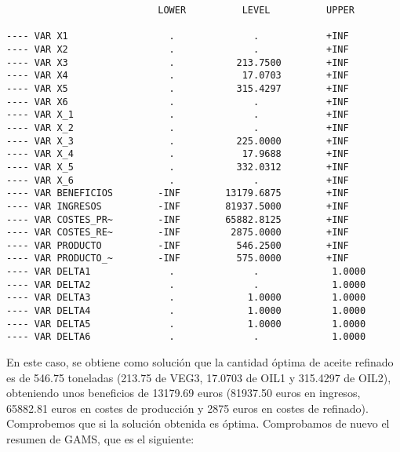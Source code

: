 \documentclass[12pt,a4paper,twoside,openright,titlepage,final]{article}
\begin{document}
\begin{verbatim}
                           LOWER          LEVEL          UPPER        

---- VAR X1                  .              .            +INF              
---- VAR X2                  .              .            +INF               
---- VAR X3                  .           213.7500        +INF                   
---- VAR X4                  .            17.0703        +INF                 
---- VAR X5                  .           315.4297        +INF                
---- VAR X6                  .              .            +INF                  
---- VAR X_1                 .              .            +INF                
---- VAR X_2                 .              .            +INF                 
---- VAR X_3                 .           225.0000        +INF                  
---- VAR X_4                 .            17.9688        +INF              
---- VAR X_5                 .           332.0312        +INF               
---- VAR X_6                 .              .            +INF         
---- VAR BENEFICIOS        -INF        13179.6875        +INF               
---- VAR INGRESOS          -INF        81937.5000        +INF                  
---- VAR COSTES_PR~        -INF        65882.8125        +INF                    
---- VAR COSTES_RE~        -INF         2875.0000        +INF                  
---- VAR PRODUCTO          -INF          546.2500        +INF                 
---- VAR PRODUCTO_~        -INF          575.0000        +INF               
---- VAR DELTA1              .              .             1.0000      
---- VAR DELTA2              .              .             1.0000    
---- VAR DELTA3              .             1.0000         1.0000    
---- VAR DELTA4              .             1.0000         1.0000              
---- VAR DELTA5              .             1.0000         1.0000           
---- VAR DELTA6              .              .             1.0000           
\end{verbatim}

En este caso, se obtiene como solución que la cantidad óptima de aceite refinado es de 546.75 toneladas (213.75 de VEG3, 17.0703 de OIL1 y 315.4297 de OIL2), obteniendo unos beneficios de 13179.69 euros (81937.50 euros en ingresos, 65882.81 euros en costes de producción y 2875 euros en costes de refinado).\\

Comprobemos que si la solución obtenida es óptima. Comprobamos de nuevo el resumen de GAMS, que es el siguiente:
\end{document}
